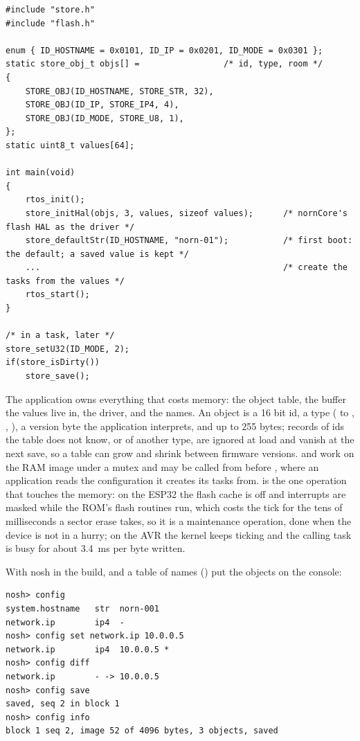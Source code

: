 \begin{lstlisting}
#include "store.h"
#include "flash.h"

enum { ID_HOSTNAME = 0x0101, ID_IP = 0x0201, ID_MODE = 0x0301 };
static store_obj_t objs[] =                 /* id, type, room */
{
    STORE_OBJ(ID_HOSTNAME, STORE_STR, 32),
    STORE_OBJ(ID_IP, STORE_IP4, 4),
    STORE_OBJ(ID_MODE, STORE_U8, 1),
};
static uint8_t values[64];

int main(void)
{
    rtos_init();
    store_initHal(objs, 3, values, sizeof values);      /* nornCore's flash HAL as the driver */
    store_defaultStr(ID_HOSTNAME, "norn-01");           /* first boot: the default; a saved value is kept */
    ...                                                 /* create the tasks from the values */
    rtos_start();
}

/* in a task, later */
store_setU32(ID_MODE, 2);
if(store_isDirty())
    store_save();
\end{lstlisting}

The application owns everything that costs memory: the object table, the buffer the
values live in, the driver, and the names. An object is a 16 bit id, a type
( to , , ), a version
byte the application interprets, and up to 255 bytes; records of ids the table does not
know, or of another type, are ignored at load and vanish at the next save, so a table
can grow and shrink between firmware versions.  and 
work on the RAM image under a mutex and may be called from  before
, where an application reads the configuration it creates its tasks
from.  is the one operation that touches the memory: on the ESP32 the
flash cache is off and interrupts are masked while the ROM's flash routines run, which
costs the tick for the tens of milliseconds a sector erase takes, so it is a maintenance
operation, done when the device is not in a hurry; on the AVR the kernel keeps ticking
and the calling task is busy for about 3.4~ms per byte written.

With nosh in the build,  and a table of names
() put the objects on the console:

\begin{lstlisting}
nosh> config
system.hostname   str  norn-001
network.ip        ip4  -
nosh> config set network.ip 10.0.0.5
network.ip        ip4  10.0.0.5 *
nosh> config diff
network.ip        - -> 10.0.0.5
nosh> config save
saved, seq 2 in block 1
nosh> config info
block 1 seq 2, image 52 of 4096 bytes, 3 objects, saved
\end{lstlisting}

